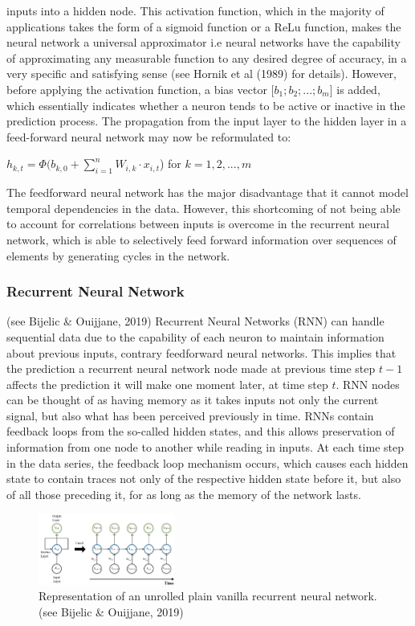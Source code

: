 \documentclass[a4paper,11pt,oneside]{book}
\begin{document}
inputs into a hidden node. This activation function, which in the majority of
applications takes the form of a sigmoid function or a ReLu function, makes the neural network a universal approximator i.e neural networks have the capability of approximating
any measurable function to any desired degree
of accuracy, in a very specific and satisfying
sense (see Hornik et al (1989) for details). However, before applying
the activation function, a bias vector [$b_{1};b_{2};...;b_{m}$] is added, which essentially
indicates whether a neuron tends to be active or inactive in the prediction process. The
propagation from the input layer to the hidden layer in a feed-forward neural
network may now be reformulated to:
 \begin{center}
	$h_{k,t} =\Phi(b_{k,0} +\sum_{i=1}^{n} W_{i,k} \cdot x_{i,t}$) for $k = 1,2,...,m$
\end{center}
The feedforward neural network has the major disadvantage that it cannot model temporal dependencies in the data. However, this shortcoming of not being able to account for correlations between inputs is overcome in the recurrent neural network, which is able to selectively feed forward information over sequences of elements by generating cycles in the network.
\subsubsection{Recurrent Neural Network} (see Bijelic \& Ouijjane, 2019)
Recurrent Neural Networks
(RNN) can handle sequential data due to the capability of each neuron to
maintain information about previous inputs, contrary feedforward neural networks. This implies that the prediction a recurrent
neural network node made at previous time step $t-1$ affects the prediction it will make one
moment later, at time step $t$. RNN nodes can be thought of as having memory as it takes inputs not only the current signal, but also
what has been perceived previously in time.\newline
RNNs contain feedback loops from the so-called hidden states, and this allows preservation of information from one node to another while reading in inputs. At each time step in the data series, the feedback loop mechanism occurs, which causes each hidden state to contain traces not only of the respective hidden state before it, but also of all those preceding it, for as long as the memory of the network lasts.\newline
\begin{figure}
	\centering
	\includegraphics[width=0.4\textwidth]{figures/RNN}
	\caption{Representation of an unrolled plain vanilla recurrent neural network. (see Bijelic \& Ouijjane, 2019)}
	
	\label{seventhfig}
\end{figure}
\end{document}
